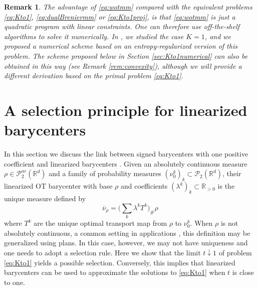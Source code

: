 \documentclass[12pt]{amsart}
\numberwithin{equation}{section}
\let\mc=\mathcal
\theoremstyle{plain}
\newtheorem{remark}[theorem]{Remark}
\theoremstyle{definition}
\begin{document}
\begin{remark} The advantage of \eqref{eq:wotmm} compared with the equivalent problems \eqref{eq:Kto1}, \eqref{eq:dualBreniermm} or \eqref{eq:Kto1proj}, is that \eqref{eq:wotmm} is just a quadratic program with linear constraints. One can therefore use off-the-shelf algorithms to solve it numerically. In \cite{gallouet2025metric}, we studied the case $K=1$, and we proposed a numerical scheme based on an entropy-regularized version of this problem. The scheme proposed below in Section \ref{sec:Kto1numerical} can also be obtained in this way (see Remark \ref{rem:convexity}), although we will provide a different derivation based on the primal problem \eqref{eq:Kto1}.
\end{remark}



\section{A selection principle for linearized barycenters} \label{sec:linearized}
In this section we discuss the link between signed barycenters with one positive coefficient and linearized barycenters \cite{merigot2020quantitative,wang2013linear}. Given an absolutely continuous measure $\rho \in \mc{P}^{ac}_2(\mathbb{R}^d)$ and a family of probability measures $(\nu_0^k)_k  \subset \mc{P}_2(\mathbb{R}^d)$, their linearized OT barycenter with base $\rho$ and coefficients $(\lambda^k)_k \subset \mathbb{R}_{>0}$ is the unique measure defined by
\[
\overline{\nu}_\rho = \Big(\sum_k \lambda^k T^k\Big)_\# \rho
\]
where $T^k$ are the unique optimal transport map from $\rho$ to $\nu_0^k$. When $\rho$ is not absolutely continuous, a common setting in applications \cite{wang2013linear,nenna2022transport,tanguy2024computing}, this definition may be generalized using plans. In this case, however, we may not have uniqueness and one needs to adopt a selection rule. Here we show that the limit $t \downarrow 1$ of problem \eqref{eq:Kto1} yields a possible selection. Conversely, this implies that linearized barycenters can be used to approximate the solutions to \eqref{eq:Kto1} when $t$ is close to one. 
\end{document}
